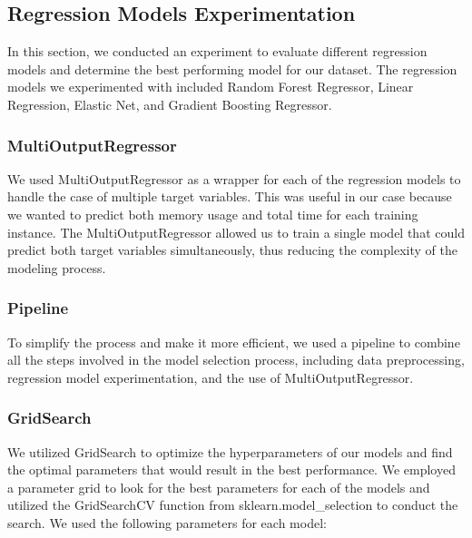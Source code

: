 \documentclass[conference]{IEEEtran}
\begin{document}
\subsection{Regression Models Experimentation}
In this section, we conducted an experiment to evaluate different regression models and determine the best performing model for our dataset. The regression models we experimented with included Random Forest Regressor, Linear Regression, Elastic Net, and Gradient Boosting Regressor.

\subsubsection{MultiOutputRegressor}

We used MultiOutputRegressor as a wrapper for each of the regression models to handle the case of multiple target variables. This was useful in our case because we wanted to predict both memory usage and total time for each training instance. The MultiOutputRegressor allowed us to train a single model that could predict both target variables simultaneously, thus reducing the complexity of the modeling process.

\subsubsection{Pipeline}

To simplify the process and make it more efficient, we used a pipeline to combine all the steps involved in the model selection process, including data preprocessing, regression model experimentation, and the use of MultiOutputRegressor.

\subsubsection{GridSearch}

We utilized GridSearch to optimize the hyperparameters of our models and find the optimal parameters that would result in the best performance. We employed a parameter grid to look for the best parameters for each of the models and utilized the GridSearchCV function from sklearn.model\_selection to conduct the search.
We used the following parameters for each model:
\end{document}
